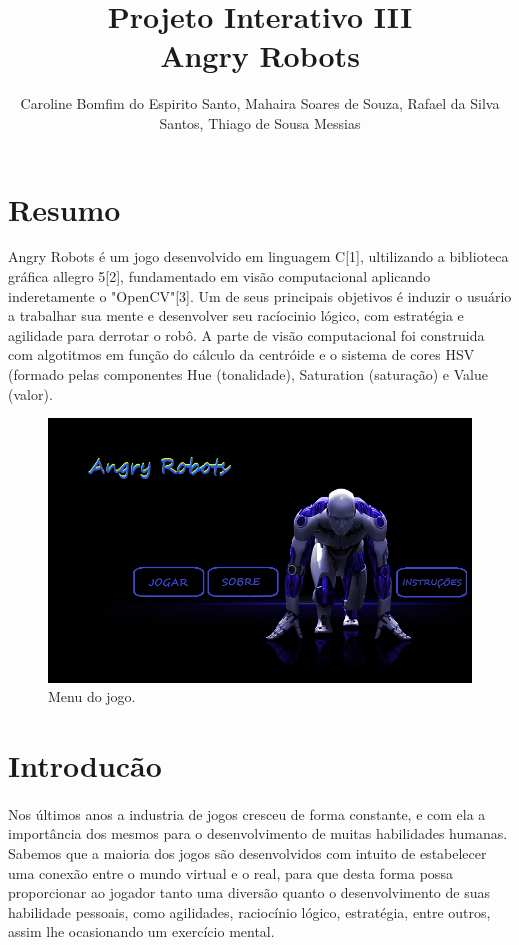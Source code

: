 \documentclass{sciposter}
\title{Projeto Interativo III\\ Angry Robots}
\author{Caroline Bomfim do Espirito Santo, Mahaira Soares de Souza, Rafael da Silva Santos, Thiago de Sousa Messias}
\institute 
{Bacharelado em Ciência da Computação\\
Centro Universitário SENAC - Campus Santo Amaro
(SENAC-SP)\\
Av. Engenheiro Eusébio Stevaux, 823 -- Santo Amaro, São Paulo -- CEP 04696-000 -- SP -- Brasil}
\begin{document}

\maketitle

\begin{multicols}{3}
\section {Resumo}

Angry Robots é um jogo desenvolvido em linguagem C[1], ultilizando a biblioteca gráfica allegro 5[2], fundamentado em visão computacional aplicando inderetamente o "OpenCV"[3]. Um de seus principais objetivos é induzir o usuário a trabalhar sua mente e desenvolver seu racíocinio lógico, com estratégia e agilidade para derrotar o robô. A parte de visão computacional foi construida com algotitmos em função do cálculo da centróide e o sistema de cores HSV (formado pelas componentes Hue (tonalidade), Saturation (saturação) e Value (valor).

\begin{figure}[!htb]
\centering
\includegraphics[scale=0.8]{menu.png}
\caption{Menu do jogo.}
\end{figure}

\section{Introducão}
\paragraph{}Nos últimos anos a industria de jogos cresceu de forma constante, e com ela a importância dos mesmos para o desenvolvimento de muitas habilidades humanas. Sabemos que a maioria dos jogos são desenvolvidos com intuito de estabelecer uma conexão entre o mundo virtual e o real, para que desta forma possa proporcionar ao jogador tanto uma diversão quanto o desenvolvimento de suas habilidade pessoais, como agilidades, raciocínio lógico, estratégia, entre outros, assim lhe ocasionando um exercício mental.

\end{multicols}
\end{document}
